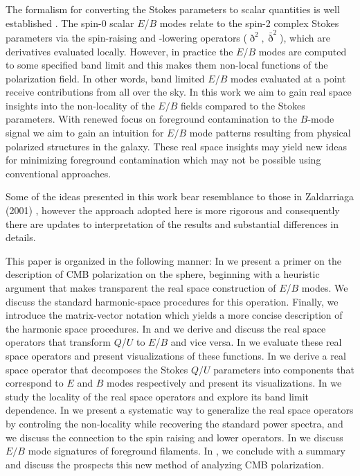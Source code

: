 The formalism for converting the Stokes parameters to scalar quantities is well established \citep{1997PhRvD..55.7368K,1997PhRvD..55.1830Z}. The spin-0 scalar $E$/$B$ modes relate to the spin-2 complex Stokes parameters via the spin-raising and -lowering operators ($\eth^2,\bar \eth^2$), which are derivatives evaluated locally.  However, in practice the $E$/$B$ modes are computed to some specified band limit and this makes them non-local functions of the polarization field.  In other words, band limited $E$/$B$ modes evaluated at a point receive contributions from all over the sky. In this work we aim to gain real space insights into the non-locality of the $E/B$ fields compared to the Stokes parameters. With renewed focus on foreground contamination to the $B$-mode signal we aim to gain an intuition for $E/B$ mode patterns resulting from physical polarized structures in the galaxy. These real space insights may yield new ideas for minimizing foreground contamination which may not be possible using conventional approaches. 

Some of the ideas presented in this work bear resemblance to those in Zaldarriaga (2001) \citep{Zaldarriaga2001a}, however the approach adopted here is more rigorous and consequently there are updates to interpretation of the results and substantial differences in details.


This paper is organized in the following manner: In  we present a primer on the description of CMB polarization on the sphere, beginning with a heuristic argument that makes transparent the real space construction of $E$/$B$ modes.  We discuss the standard harmonic-space procedures for this operation. Finally, we introduce the matrix-vector notation which yields a more concise description of the harmonic space procedures. In  and  we derive and discuss the real space operators that transform $Q$/$U$ to $E$/$B$ and vice versa. In  we evaluate these real space operators and present visualizations of these functions. In  we derive a real space operator that decomposes the Stokes $Q$/$U$  parameters into components that correspond to $E$ and $B$ modes respectively and present its visualizations.  In  we study the locality of the real space operators and explore its band limit dependence. In  we present a systematic way to generalize the real space operators by controling the non-locality while recovering the standard power spectra, and we discuss the connection to the spin raising and lower operators. In  we discuss $E/B$ mode signatures of foreground filaments. In , we conclude with a summary and discuss the prospects this new method of analyzing CMB polarization.
